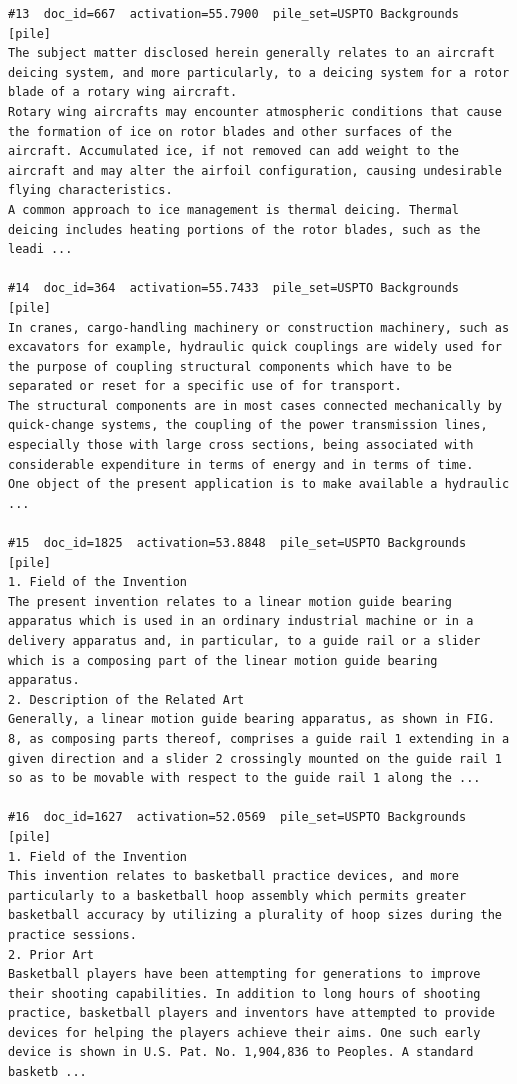 \begin{verbatim}
#13  doc_id=667  activation=55.7900  pile_set=USPTO Backgrounds  [pile]
The subject matter disclosed herein generally relates to an aircraft deicing system, and more particularly, to a deicing system for a rotor blade of a rotary wing aircraft.
Rotary wing aircrafts may encounter atmospheric conditions that cause the formation of ice on rotor blades and other surfaces of the aircraft. Accumulated ice, if not removed can add weight to the aircraft and may alter the airfoil configuration, causing undesirable flying characteristics.
A common approach to ice management is thermal deicing. Thermal deicing includes heating portions of the rotor blades, such as the leadi ...

#14  doc_id=364  activation=55.7433  pile_set=USPTO Backgrounds  [pile]
In cranes, cargo-handling machinery or construction machinery, such as excavators for example, hydraulic quick couplings are widely used for the purpose of coupling structural components which have to be separated or reset for a specific use of for transport.
The structural components are in most cases connected mechanically by quick-change systems, the coupling of the power transmission lines, especially those with large cross sections, being associated with considerable expenditure in terms of energy and in terms of time.
One object of the present application is to make available a hydraulic ...

#15  doc_id=1825  activation=53.8848  pile_set=USPTO Backgrounds  [pile]
1. Field of the Invention
The present invention relates to a linear motion guide bearing apparatus which is used in an ordinary industrial machine or in a delivery apparatus and, in particular, to a guide rail or a slider which is a composing part of the linear motion guide bearing apparatus.
2. Description of the Related Art
Generally, a linear motion guide bearing apparatus, as shown in FIG. 8, as composing parts thereof, comprises a guide rail 1 extending in a given direction and a slider 2 crossingly mounted on the guide rail 1 so as to be movable with respect to the guide rail 1 along the ...

#16  doc_id=1627  activation=52.0569  pile_set=USPTO Backgrounds  [pile]
1. Field of the Invention
This invention relates to basketball practice devices, and more particularly to a basketball hoop assembly which permits greater basketball accuracy by utilizing a plurality of hoop sizes during the practice sessions.
2. Prior Art
Basketball players have been attempting for generations to improve their shooting capabilities. In addition to long hours of shooting practice, basketball players and inventors have attempted to provide devices for helping the players achieve their aims. One such early device is shown in U.S. Pat. No. 1,904,836 to Peoples. A standard basketb ...


\end{verbatim}
